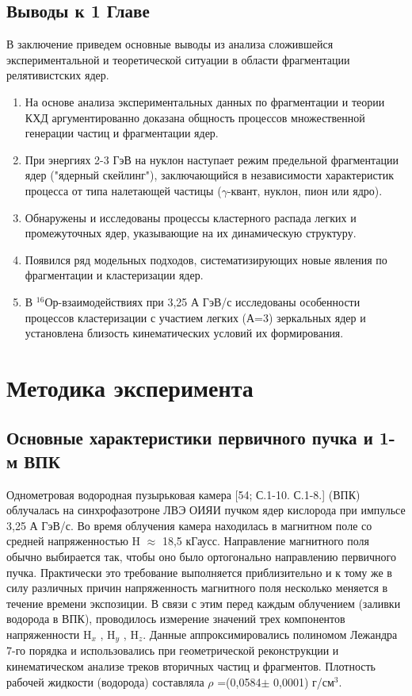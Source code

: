 \documentclass[fontsize=14pt]{scrreport}
\begin{document}
\section*{Выводы к 1 Главе}
\hspace{0.6cm}
В заключение приведем основные выводы из анализа сложившейся
экспериментальной и теоретической ситуации в области фрагментации
релятивистских ядер.
\begin{enumerate}
    \item На основе анализа экспериментальных данных по фрагментации и теории КХД аргументированно доказана общность процессов множественной генерации частиц и фрагментации ядер.
    \item При энергиях 2-3 ГэВ на нуклон наступает режим предельной фрагментации ядер ("ядерный скейлинг"), заключающийся в независимости характеристик процесса от типа налетающей частицы ($\gamma$-квант, нуклон, пион или ядро).
    \item Обнаружены и исследованы процессы кластерного распада легких и промежуточных ядер, указывающие на их динамическую структуру.
    \item Появился ряд модельных подходов, систематизирующих новые явления по фрагментации и кластеризации ядер.
    \item В $^{16}$Ор-взаимодействиях при 3,25 А ГэВ/с исследованы особенности процессов кластеризации с участием легких (А=3) зеркальных ядер и установлена близость кинематических условий их формирования.
\end{enumerate}

\chapter{Методика эксперимента}
\section{Основные характеристики первичного пучка и 1-м ВПК}
\hspace{0.6cm}
Однометровая водородная пузырьковая камера [54; С.1-10. С.1-8.]
(ВПК) облучалась на синхрофазотроне ЛВЭ ОИЯИ пучком ядер кислорода
при импульсе 3,25 А ГэВ/с. Во время облучения камера находилась в
магнитном поле со средней напряженностью H $\approx$ 18,5 кГаусс. Направление магнитного поля обычно выбирается так, чтобы оно было ортогонально направлению первичного пучка. Практически это требование выполняется приблизительно и к тому же в силу различных причин напряженность магнитного поля несколько меняется в течение времени экспозиции. В связи с этим перед каждым облучением (заливки водорода в ВПК), проводилось измерение значений трех компонентов напряженности H$_{x}$ , H$_{y}$ , H$_{z}$. Данные аппроксимировались полиномом Лежандра 7-го порядка и использовались при геометрической реконструкции и кинематическом анализе треков вторичных частиц и фрагментов. Плотность рабочей жидкости (водорода) составляла $\rho$ =(0,0584$\pm$ 0,0001) г/см$^{3}$.
\end{document}
